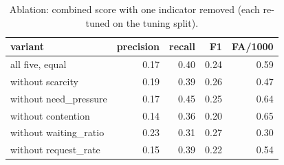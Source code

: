 \begin{table}[t]
\centering
\footnotesize
\caption{Ablation: combined score with one indicator removed (each re-tuned on the tuning split).}
\label{tab:ablation}
\begin{tabular}{lrrrr}
\toprule
variant & precision & recall & F1 & FA/1000 \\
\midrule
all five, equal & 0.17 & 0.40 & 0.24 & 0.59 \\
without scarcity & 0.19 & 0.39 & 0.26 & 0.47 \\
without need\_pressure & 0.17 & 0.45 & 0.25 & 0.64 \\
without contention & 0.14 & 0.36 & 0.20 & 0.65 \\
without waiting\_ratio & 0.23 & 0.31 & 0.27 & 0.30 \\
without request\_rate & 0.15 & 0.39 & 0.22 & 0.54 \\
\bottomrule
\end{tabular}
\end{table}

